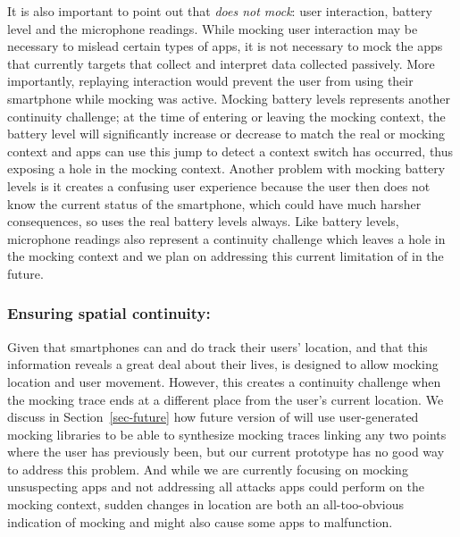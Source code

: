 It is also important to point out that \PocketMocker{} \textit{does
not mock}: user interaction, battery level and the microphone
readings. While mocking user interaction may be necessary to mislead certain
types of apps, it is not necessary to mock the apps that \PocketMocker{}
currently targets that collect and interpret data collected passively. More
importantly, replaying interaction would prevent the user from using their
smartphone while mocking was active. Mocking battery levels represents another
continuity challenge; at the time of entering or leaving the mocking context,
the battery level will significantly increase or decrease to match the real or
mocking context and apps can use this jump to detect a context switch has
occurred, thus exposing a hole in the mocking context. Another problem with
mocking battery levels is it creates a confusing user experience because the
user then does not know the current status of the smartphone, which could have
much harsher consequences, so \PocketMocker{} uses the real battery levels
always. Like battery levels, microphone readings also represent a continuity
challenge which leaves a hole in the mocking context and we plan on addressing
this current limitation of \PocketMocker{} in the future.

\subsubsection{Ensuring spatial continuity:\space}

Given that smartphones can and do track their users' location, and that this
information reveals a great deal about their lives, \PocketMocker{} is
designed to allow mocking location and user movement. However, this creates a
continuity challenge when the mocking trace ends at a different place from
the user's current location. We discuss in Section~\ref{sec-future} how
future version of \PocketMocker{} will use user-generated mocking libraries
to be able to synthesize mocking traces linking any two points where the user
has previously been, but our current prototype has no good way to address
this problem. And while we are currently focusing on mocking unsuspecting
apps and not addressing all attacks apps could perform on the mocking
context, sudden changes in location are both an all-too-obvious indication of
mocking and might also cause some apps to malfunction.

